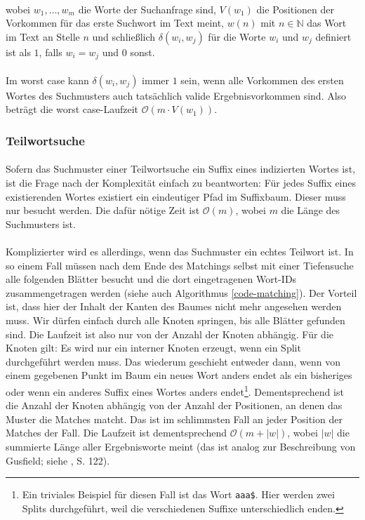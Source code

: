 \paragraph{} wobei $w_1, \dots, w_m$ die Worte der Suchanfrage sind, $V(w_1)$ die Positionen der Vorkommen für das erste Suchwort im Text meint, $w(n)$ mit $n \in \mathbb{N}$ das Wort im Text an Stelle $n$ und schließlich $\delta(w_i,w_j)$ für die Worte $w_i$ und $w_j$ definiert ist als $1$, falls $w_i = w_j$ und $0$ sonst.
\paragraph{} Im worst case kann $\delta(w_i,w_j)$ immer $1$ sein, wenn alle Vorkommen des ersten Wortes des Suchmusters auch tatsächlich valide Ergebnisvorkommen sind. Also beträgt die worst case-Laufzeit $\mathcal{O}(m \cdot V(w_1))$.

\subsubsection{Teilwortsuche}

\paragraph{} Sofern das Suchmuster einer Teilwortsuche ein Suffix eines indizierten Wortes ist, ist die Frage nach der Komplexität einfach zu beantworten: Für jedes Suffix eines existierenden Wortes existiert ein eindeutiger Pfad im Suffixbaum. Dieser muss nur besucht werden. Die dafür nötige Zeit ist $\mathcal{O}(m)$, wobei $m$ die Länge des Suchmusters ist.
\paragraph{} Komplizierter wird es allerdings, wenn das Suchmuster ein echtes Teilwort ist. In so einem Fall müssen nach dem Ende des Matchings selbst mit einer Tiefensuche alle folgenden Blätter besucht und die dort eingetragenen Wort-IDs zusammengetragen werden (siehe auch Algorithmus \ref{code-matching}). Der Vorteil ist, dass hier der Inhalt der Kanten des Baumes nicht mehr angesehen werden muss. Wir dürfen einfach durch alle Knoten springen, bis alle Blätter gefunden sind. Die Laufzeit ist also nur von der Anzahl der Knoten abhängig. Für die Knoten gilt: Es wird nur ein interner Knoten erzeugt, wenn ein Split durchgeführt werden muss. Das wiederum geschieht entweder dann, wenn von einem gegebenen Punkt im Baum ein neues Wort anders endet als ein bisheriges oder wenn ein anderes Suffix eines Wortes anders endet\footnote{Ein triviales Beispiel für diesen Fall ist das Wort \texttt{aaa\$}. Hier werden zwei Splits durchgeführt, weil die verschiedenen Suffixe unterschiedlich enden.}. Dementsprechend ist die Anzahl der Knoten abhängig von der Anzahl der Positionen, an denen das Muster die Matches matcht. Das ist im schlimmsten Fall an jeder Position der Matches der Fall. Die Laufzeit ist dementsprechend $\mathcal{O}(m + |w|)$, wobei $|w|$ die summierte Länge aller Ergebnisworte meint (das ist analog zur Beschreibung von Gusfield; siehe \cite{gusfield}, S. 122).

